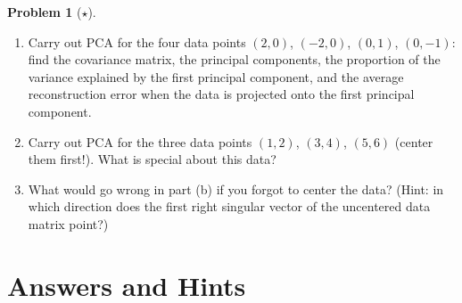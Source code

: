 \documentclass[11pt]{article}
\theoremstyle{definition}
\newtheorem{problem}{Problem}[section]
\begin{document}
\begin{problem}[$\star$]\label{pr:pca}
    \begin{enumerate}[label=(\alph*)]
        \item Carry out PCA for the four data points $(2, 0)$, $(-2, 0)$, $(0, 1)$, $(0, -1)$: find the covariance matrix, the principal components, the proportion of the variance explained by the first principal component, and the average reconstruction error when the data is projected onto the first principal component.
        \item Carry out PCA for the three data points $(1, 2)$, $(3, 4)$, $(5, 6)$ (center them first!). What is special about this data?
        \item What would go wrong in part (b) if you forgot to center the data? (Hint: in which direction does the first right singular vector of the uncentered data matrix point?)
    \end{enumerate}
\end{problem}

\section*{Answers and Hints}
\end{document}
